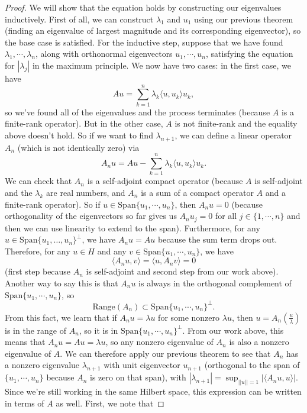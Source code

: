 \begin{proof}
We will show that the equation holds by constructing our eigenvalues inductively. First of all, we can construct $\lambda_1$ and $u_1$ using our previous theorem (finding an eigenvalue of largest magnitude and its corresponding eigenvector), so the base case is satisfied. For the inductive step, suppose that we have found $\lambda_1, \cdots, \lambda_n$, along with orthonormal eigenvectors $u_1, \cdots, u_n$, satisfying the equation for $|\lambda_j|$ in the maximum principle. We now have two cases: in the first case, we have 
\[
    Au = \sum_{k=1}^n \lambda_k \langle u, u_k \rangle u_k,
\]
so we've found all of the eigenvalues and the process terminates (because $A$ is a finite-rank operator). But in the other case, $A$ is not finite-rank and the equality above doesn't hold. So if we want to find $\lambda_{n+1}$, we can define a linear operator $A_n$ (which is not identically zero) via
\[
    A_n u = Au  - \sum_{k=1}^n \lambda_k \langle u, u_k \rangle u_k.
\]
We can check that $A_n$ is a self-adjoint compact operator (because $A$ is self-adjoint and the $\lambda_k$ are real numbers, and $A_n$ is a sum of a compact operator $A$ and a finite-rank operator). So if $u \in \text{Span}\{u_1, \cdots, u_n\}$, then $A_n u = 0$ (because orthogonality of the eigenvectors so far gives us $A_n u_j = 0$ for all $j \in \{1, \cdots, n\}$ and then we can use linearity to extend to the span). Furthermore, for any $u \in \text{Span}\{u_1, \dots, u_n\}^\perp$, we have $A_n u = Au$ because the sum term drops out. Therefore, for any $u \in H$ and any $v \in \text{Span}\{u_1, \cdots, u_n\}$, we have
\[
    \langle A_nu, v \rangle = \langle u, A_n v \rangle = 0
\]
(first step because $A_n$ is self-adjoint and second step from our work above). Another way to say this is that $A_nu$ is always in the orthogonal complement of $\text{Span}\{u_1, \cdots, u_n\}$, so 
\[
    \text{Range}(A_n) \subset \text{Span}\{u_1, \cdots, u_n\}^\perp.
\]
From this fact, we learn that if $A_n u = \lambda u$ for some nonzero $\lambda u$, then $u = A_n\left(\frac{u}{\lambda}\right)$ is in the range of $A_n$, so it is in $\text{Span}\{u_1, \cdots, u_n\}^\perp$. From our work above, this means that $A_n u = A u = \lambda u$, so any nonzero eigenvalue of $A_n$ is also a nonzero eigenvalue of $A$. We can therefore apply our previous theorem to see that $A_n$ has a nonzero eigenvalue $\lambda_{n+1}$ with unit eigenvector $u_{n+1}$ (orthogonal to the span of $\{u_1, \cdots, u_n\}$ because $A_n$ is zero on that span), with $|\lambda_{n+1}| = \sup_{||u|| = 1} |\langle A_nu, u \rangle|$. Since we're still working in the same Hilbert space, this expression can be written in terms of $A$ as well. First, we note that

\end{proof}
